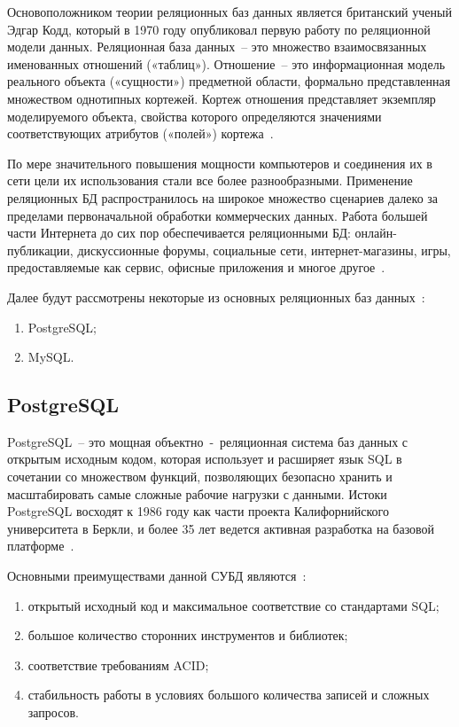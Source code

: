 Основоположником теории реляционных баз данных является британский ученый Эдгар Кодд, который в 1970 году опубликовал первую работу по реляционной модели данных.
Реляционная база данных~-- это множество взаимосвязанных именованных отношений («таблиц»).
Отношение~-- это информационная модель реального объекта («сущности») предметной области, формально представленная множеством однотипных кортежей.
Кортеж отношения представляет экземпляр моделируемого объекта, свойства которого определяются значениями соответствующих атрибутов («полей») кортежа~\cite{baseDB}.

По мере значительного повышения мощности компьютеров и соединения их в сети цели их использования стали все более разнообразными.
Применение реляционных БД распространилось на широкое множество сценариев далеко за пределами первоначальной обработки коммерческих данных.
Работа большей части Интернета до сих пор обеспечивается реляционными БД: онлайн-публикации, дискуссионные форумы, социальные сети, интернет-магазины, игры, предоставляемые как сервис, офисные приложения и многое другое~\cite{highloadApps}.

Далее будут рассмотрены некоторые из основных реляционных баз данных~\cite{lections}:
\begin{enumerate}
	\item PostgreSQL;
	\item MySQL.
\end{enumerate}

\subsection{PostgreSQL}

PostgreSQL~-- это мощная объектно~-~реляционная система баз данных с открытым исходным кодом, которая использует и расширяет язык SQL в сочетании со множеством функций, позволяющих безопасно хранить и масштабировать самые сложные рабочие нагрузки с данными.
Истоки PostgreSQL восходят к 1986 году как части проекта Калифорнийского университета в Беркли, и более 35 лет ведется активная разработка на базовой платформе~\cite{postgresql}.

Основными преимуществами данной СУБД являются~\cite{cmpSCDB1, cmpSCDB2, cmpSCDB3}:
\begin{enumerate}
	\item открытый исходный код и максимальное соответствие со стандартами SQL;
	\item большое количество сторонних инструментов и библиотек;
	\item соответствие требованиям ACID;
	\item стабильность работы в условиях большого количества записей и сложных запросов.
\end{enumerate}

